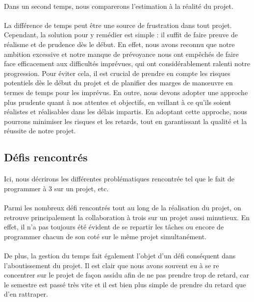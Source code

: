 \paragraph{}
    Dans un second temps, nous comparerons l'estimation à la réalité du projet.
    
\paragraph{}
    La différence de temps peut être une source de frustration dans tout projet. Cependant, la solution pour y remédier est simple : il suffit de faire preuve de réalisme et de prudence dès le début. En effet, nous avons reconnu que notre ambition excessive et notre manque de prévoyance nous ont empêchés de faire face efficacement aux difficultés imprévues, qui ont considérablement ralenti notre progression. Pour éviter cela, il est crucial de prendre en compte les risques potentiels dès le début du projet et de planifier des marges de manœuvre en termes de temps pour les imprévus. En outre, nous devons adopter une approche plus prudente quant à nos attentes et objectifs, en veillant à ce qu'ils soient réalistes et réalisables dans les délais impartis. En adoptant cette approche, nous pourrons minimiser les risques et les retards, tout en garantissant la qualité et la réussite de notre projet.
    
\subsection{Défis rencontrés}

\paragraph{}
    Ici, nous décrirons les différentes problématiques rencontrée tel que le fait de programmer à 3 sur un projet, etc.

\paragraph{}
    Parmi les nombreux défi rencontrés tout au long de la réalisation du projet, on retrouve principalement la collaboration à trois sur un projet aussi minutieux. En effet, il n’a pas toujours été évident de se repartir les tâches ou encore de programmer chacun de son coté sur le même projet simultanément.
\paragraph{}
    De plus, la gestion du temps fait également l’objet d’un défi conséquent dans l’aboutissement du projet. Il est clair que nous avons souvent eu à se re concentrer sur le projet de façon assidu afin de ne pas prendre trop de retard, car le semestre est passé très vite et il est bien plus simple de prendre du retard que d'en rattraper.
